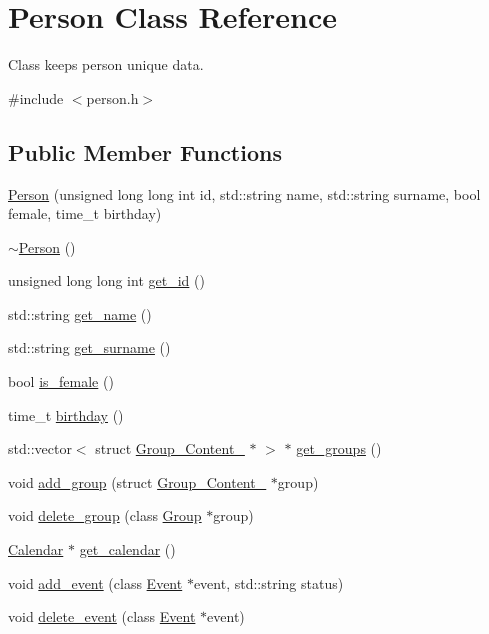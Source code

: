 \hypertarget{classPerson}{
\section{Person Class Reference}
\label{d1/d63/classPerson}
}


Class keeps person unique data.  




{\ttfamily \#include $<$person.h$>$}

\subsection*{Public Member Functions}
\begin{DoxyCompactItemize}
\item 
\hyperlink{classPerson_aaf1ee270b2217213e07b5a28c498aa04}{Person} (unsigned long long int id, std::string name, std::string surname, bool female, time\_\-t birthday)
\item 
\hyperlink{classPerson_a700ffd693321c5fe6880262acf43d4da}{$\sim$Person} ()
\item 
unsigned long long int \hyperlink{classPerson_ae335564db9f9bac47de6ddf181ee8fb9}{get\_\-id} ()
\item 
std::string \hyperlink{classPerson_a1837ca2f4ba804aeee2a70c1a1fdd468}{get\_\-name} ()
\item 
std::string \hyperlink{classPerson_aad33f79ec5c96aa3ab30c9c4c989fb4b}{get\_\-surname} ()
\item 
bool \hyperlink{classPerson_a8bfe5b0c264f051b85812c692691e277}{is\_\-female} ()
\item 
time\_\-t \hyperlink{classPerson_aec14dd73ca58227cc70c4ba3a5065d02}{birthday} ()
\item 
std::vector$<$ struct \hyperlink{structGroup__Content__}{Group\_\-Content\_\-} $\ast$ $>$ $\ast$ \hyperlink{classPerson_a24cd3ad56c42c1cd34505b1094e6e7d5}{get\_\-groups} ()
\item 
void \hyperlink{classPerson_abe0a73c74f8a32b8b5234aeb35b01d0a}{add\_\-group} (struct \hyperlink{structGroup__Content__}{Group\_\-Content\_\-} $\ast$group)
\item 
void \hyperlink{classPerson_a0b0b2e78e7c32c0ba6596d4049c703ef}{delete\_\-group} (class \hyperlink{classGroup}{Group} $\ast$group)
\item 
\hyperlink{classCalendar}{Calendar} $\ast$ \hyperlink{classPerson_abaaac95db5394d3ad78ad08221b1d231}{get\_\-calendar} ()
\item 
void \hyperlink{classPerson_ad09163d94c447622dc8c56d09decc7b6}{add\_\-event} (class \hyperlink{classEvent}{Event} $\ast$event, std::string status)
\item 
void \hyperlink{classPerson_acf5eded0c8d4c2aef744a2b877dc78f2}{delete\_\-event} (class \hyperlink{classEvent}{Event} $\ast$event)
\end{DoxyCompactItemize}


